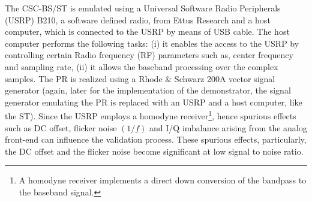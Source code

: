 The CSC-BS/ST is emulated using a Universal Software Radio Peripherals (USRP) B210, a software defined radio, from Ettus Research \cite{Ettus} and a host computer, which is connected to the USRP by means of USB cable. The host computer performs the following tasks: (i) it enables the access to the USRP by controlling certain Radio frequency (RF) parameters such as, center frequency and sampling rate, (ii) it allows the baseband processing over the complex samples. %
The PR is realized using a Rhode $\&$ Schwarz 200A vector signal generator (again, later for the implementation of the demonstrator, the signal generator emulating the PR is replaced with an USRP and a host computer, like the ST). Since the USRP employs a homodyne receiver\footnote{A homodyne receiver implements a direct down conversion of the bandpass to the baseband signal.}, hence spurious effects such as DC offset, flicker noise $(1/f)$ and I/Q imbalance arising from the analog front-end can influence the validation process. These spurious effects, particularly, the DC offset and the flicker noise become significant at low signal to noise ratio. 

